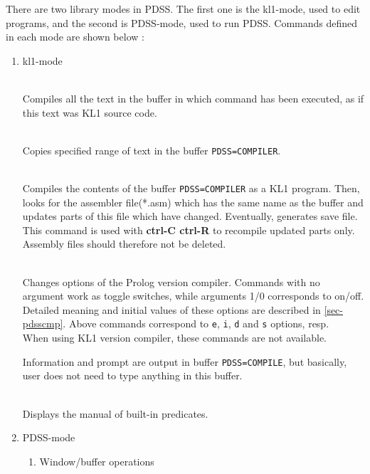 There are two library modes in PDSS. The first one is the kl1-mode, used to
edit programs, and the second is PDSS-mode, used to run PDSS. Commands
defined in each mode are shown below :
\begin{enumerate}
\item kl1-mode
\begin{enumerate}
\begin{itemize}

\\
Compiles all the text in the buffer in which command has been executed, as if
this text was KL1 source code.

\\
Copies specified range of text in the buffer \verb|PDSS=COMPILER|.

\\
Compiles the contents of the buffer \verb|PDSS=COMPILER| as a KL1 program.
Then, looks for the assembler file(*.asm) which has the same name as the buffer
and updates parts of this file which have changed.
Eventually, generates save file.\\
This command is used with {\bf ctrl-C ctrl-R} to recompile updated parts
only. Assembly files should therefore not be deleted.

\\
Changes options of the Prolog version compiler. Commands with no argument
work as toggle switches, while arguments 1/0 corresponds to on/off. Detailed
meaning and initial values of these options are described in \ref{sec-pdsscmp}.
Above commands correspond to \verb|e|, \verb|i|, \verb|d|
and \verb|s| options, resp.\\
When using KL1 version compiler, these commands are not available.

\Caution Information and prompt are output in buffer \verb|PDSS=COMPILE|,
but basically, user does not need to type anything in this buffer.

\\
Displays the manual of built-in predicates.

\end{itemize}
\end{enumerate}
\item PDSS-mode
\begin{enumerate}
\item Window/buffer operations
\begin{itemize}


\end{itemize}
\end{enumerate}
\end{enumerate}
